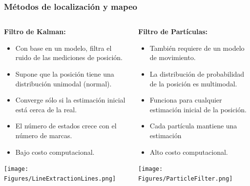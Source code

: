 \documentclass[10pt,spanish,aspectratio=1610]{beamer}
\begin{document}
\begin{frame}\frametitle{Métodos de localización y mapeo}
  \begin{columns}
    \begin{column}{0.45\textwidth}
      \textbf{Filtro de Kalman:} 
      \begin{itemize}
      \item Con base en un modelo, filtra el ruido de las mediciones de posición.
      \item Supone que la posición tiene una distribución unimodal (normal).
      \item Converge sólo si la estimación inicial está cerca de la real.
      \item El número de estados crece con el número de marcas.
      \item Bajo costo computacional.
      \end{itemize}
      \texttt{[image: Figures/LineExtractionLines.png]}
    \end{column}
    \begin{column}{0.45\textwidth}
      \textbf{Filtro de Partículas:}
      \begin{itemize}
      \item También requiere de un modelo de movimiento.
      \item La distribución de probabilidad de la posición es multimodal.
      \item Funciona para cualquier estimación inicial de la posición.
        \item Cada partícula mantiene una estimación
      \item Alto costo computacional.
      \end{itemize}
      \texttt{[image: Figures/ParticleFilter.png]}
    \end{column}
  \end{columns}
\end{frame}
\end{document}
